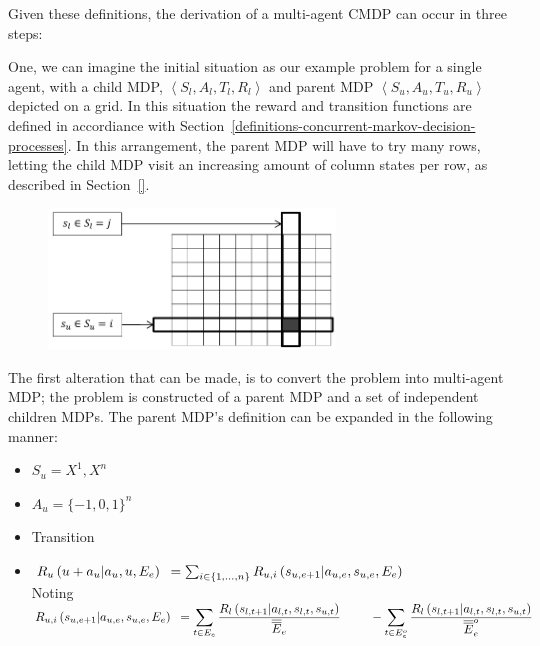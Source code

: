 \documentclass[compsoc,journal,letterpaper,10pt,draftcls,twocolumn]{IEEEtran}
\begin{document}
Given these definitions, the derivation of a multi-agent CMDP can occur
in three steps:

One, we can imagine the initial situation as our example problem for a
single agent, with a child MDP,
\(\left\langle S_{l},A_{l},T_{l},R_{l} \right\rangle\) and parent MDP
\(\left\langle S_{u},A_{u},T_{u},R_{u} \right\rangle\) depicted on a
grid. In this situation the reward and transition functions are defined
in accordiance with Section~\ref{definitions-concurrent-markov-decision-processes}. In this arrangement, the parent MDP
will have to try many rows, letting the child MDP visit an increasing
amount of column states per row, as described in Section~\ref{}.

\begin{figure}[!t]
\centering
\includegraphics[width=3in]{media/figure7.pdf}
\end{figure}

The first alteration that can be made, is to convert the problem into
multi-agent MDP; the problem is constructed of a parent MDP and a set of
independent children MDPs. The parent MDP's definition can be expanded
in the following manner:

\begin{itemize}
\item \(S_{u}  = X^{1}, X^{n}\)
\item
  \(A_{u} = {\{ - 1, 0, 1\}}^{n}\)
\item Transition
\item
  \(R_{u}\left( u + a_{u} \middle |a_{u}, u, E_{e} \right)  \\ {\ }= \sum_{i \in \{ 1, \ldots, n \}}R_{u,i}\left( s_{u,e + 1} \middle|a_{u,e}, s_{u,e}, E_{e} \right)\)\\
    Noting\\
    \(R_{u,i}\left( s_{u,e + 1} \middle|a_{u,e}, s_{u,e}, E_{e} \right) \\ {\ } = \displaystyle \sum_{t \in E_{e}} \frac{R_{l}\left( s_{l, t + 1} \middle| a_{l,t}, s_{l,t}, s_{u,t} \right)}{\overline{\overline E}_{e}} \\ {\ } \qquad - \displaystyle\sum_{t \in E_{e}^{o}} \frac{R_{l}\left( s_{l,t + 1} \middle| a_{l,t}, s_{l,t}, s_{u,t} \right)}{\overline{\overline E}_{e}^{o}}\)
 
\end{itemize}
\end{document}
